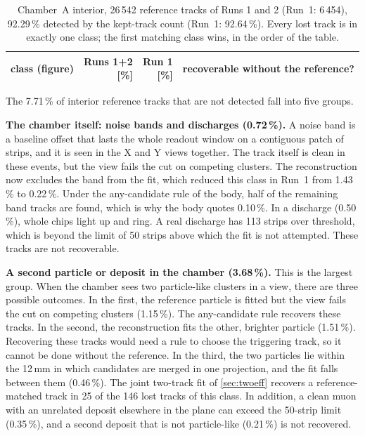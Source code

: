 \begin{table}[tbp]
  \centering\small
  \caption{Chamber~A interior, 26\,542 reference tracks of Runs 1 and 2 (Run~1: 6\,454), 92.29\,\% detected by the
  kept-track count (Run~1: 92.64\,\%). Every lost track is in exactly one class; the first matching class wins, in the
  order of the table.}
  \label{tab:losses}
  \begin{tabular}{p{5.3cm}rrp{6.6cm}}
    \hline
    class (figure) & \shortstack{Runs 1+2\\{}[\%]} & \shortstack{Run 1\\{}[\%]} & recoverable without the reference? \\
    \hline
  \end{tabular}
\end{table}

The 7.71\,\% of interior reference tracks that are not detected fall into five groups.

\textbf{The chamber itself: noise bands and discharges (0.72\,\%).} A noise band is a baseline offset that lasts the
whole readout window on a contiguous patch of strips, and it is seen in the X and Y views together. The track itself
is clean in these events, but the view fails the cut on competing clusters. The reconstruction now excludes the band
from the fit, which reduced this class in Run~1 from 1.43\,\% to 0.22\,\%. Under the any-candidate rule of the body,
half of the remaining band tracks are found, which is why the body quotes 0.10\,\%. In a discharge (0.50\,\%), whole
chips light up and ring. A real discharge has 113 strips over threshold, which is beyond the limit of 50 strips above
which the fit is not attempted. These tracks are not recoverable.

\textbf{A second particle or deposit in the chamber (3.68\,\%).} This is the largest group. When the chamber sees two
particle-like clusters in a view, there are three possible outcomes. In the first, the reference particle is fitted
but the view fails the cut on competing clusters (1.15\,\%). The any-candidate rule recovers these tracks. In the
second, the reconstruction fits the other, brighter particle (1.51\,\%). Recovering these tracks would need a rule to
choose the triggering track, so it cannot be done without the reference. In the third, the two particles lie within
the 12\,mm in which candidates are merged in one projection, and the fit falls between them (0.46\,\%). The joint
two-track fit of \cref{sec:twoeff} recovers a reference-matched track in 25 of the 146 lost tracks of this class. In
addition, a clean muon with an unrelated deposit elsewhere in the plane can exceed the 50-strip limit (0.35\,\%), and a
second deposit that is not particle-like (0.21\,\%) is not recovered.

